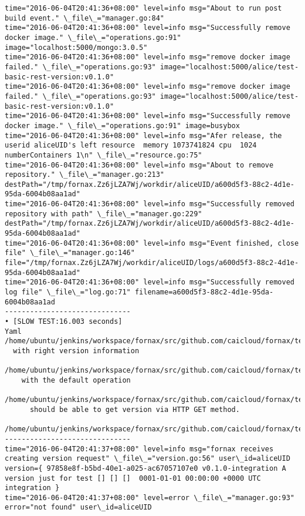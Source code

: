 \begin{lstlisting}[caption={Fornax功能性测试日志}]
time="2016-06-04T20:41:36+08:00" level=info msg="About to run post build event." \_file\_="manager.go:84" 
time="2016-06-04T20:41:36+08:00" level=info msg="Successfully remove docker image." \_file\_="operations.go:91" image="localhost:5000/mongo:3.0.5" 
time="2016-06-04T20:41:36+08:00" level=info msg="remove docker image failed." \_file\_="operations.go:93" image="localhost:5000/alice/test-basic-rest-version:v0.1.0" 
time="2016-06-04T20:41:36+08:00" level=info msg="remove docker image failed." \_file\_="operations.go:93" image="localhost:5000/alice/test-basic-rest-version:v0.1.0" 
time="2016-06-04T20:41:36+08:00" level=info msg="Successfully remove docker image." \_file\_="operations.go:91" image=busybox 
time="2016-06-04T20:41:36+08:00" level=info msg="Afer release, the userid aliceUID's left resource  memory 1073741824 cpu  1024 numberContainers 1\n" \_file\_="resource.go:75" 
time="2016-06-04T20:41:36+08:00" level=info msg="About to remove repository." \_file\_="manager.go:213" destPath="/tmp/fornax.Zz6jLZA7Wj/workdir/aliceUID/a600d5f3-88c2-4d1e-95da-6004b08aa1ad" 
time="2016-06-04T20:41:36+08:00" level=info msg="Successfully removed repository with path" \_file\_="manager.go:229" destPath="/tmp/fornax.Zz6jLZA7Wj/workdir/aliceUID/a600d5f3-88c2-4d1e-95da-6004b08aa1ad" 
time="2016-06-04T20:41:36+08:00" level=info msg="Event finished, close file" \_file\_="manager.go:146" file="/tmp/fornax.Zz6jLZA7Wj/workdir/aliceUID/logs/a600d5f3-88c2-4d1e-95da-6004b08aa1ad" 
time="2016-06-04T20:41:36+08:00" level=info msg="Successfully removed log file" \_file\_="log.go:71" filename=a600d5f3-88c2-4d1e-95da-6004b08aa1ad 
------------------------------
• [SLOW TEST:16.003 seconds]
Yaml
/home/ubuntu/jenkins/workspace/fornax/src/github.com/caicloud/fornax/tests/yaml/yaml\_test.go:243
  with right version information
  /home/ubuntu/jenkins/workspace/fornax/src/github.com/caicloud/fornax/tests/yaml/yaml\_test.go:242
    with the default operation
    /home/ubuntu/jenkins/workspace/fornax/src/github.com/caicloud/fornax/tests/yaml/yaml\_test.go:152
      should be able to get version via HTTP GET method.
      /home/ubuntu/jenkins/workspace/fornax/src/github.com/caicloud/fornax/tests/yaml/yaml\_test.go:151
------------------------------
time="2016-06-04T20:41:37+08:00" level=info msg="fornax receives creating version request" \_file\_="version.go:56" user\_id=aliceUID version={ 97858e8f-b5bd-40e1-a025-ac67057107e0 v0.1.0-integration A version just for test [] [] []  0001-01-01 00:00:00 +0000 UTC   integration } 
time="2016-06-04T20:41:37+08:00" level=error \_file\_="manager.go:93" error="not found" user\_id=aliceUID 

\end{lstlisting}
